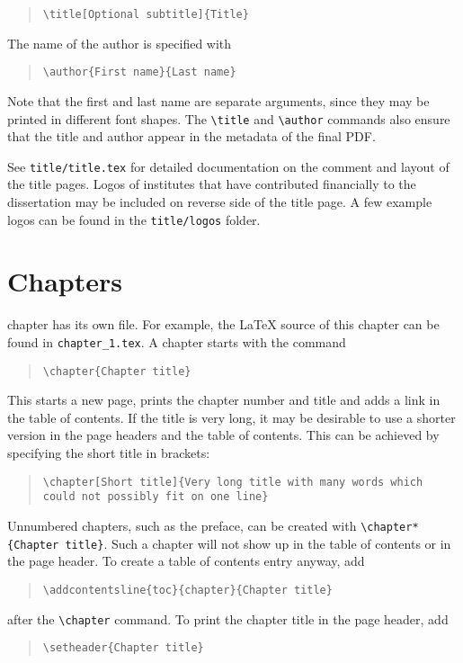 \begin{quote}
	\texttt{\textbackslash title[Optional subtitle]\{Title\}}
\end{quote}
The name of the author is specified with
\begin{quote}
	\texttt{\textbackslash author\{First name\}\{Last name\}}
\end{quote}
Note that the first and last name are separate arguments, since they may be printed in different font shapes. The \texttt{\textbackslash title} and \texttt{\textbackslash author} commands also ensure that the title and author appear in the metadata of the final PDF.

See \texttt{title/title.tex} for detailed documentation on the comment and layout of the title pages. Logos of institutes that have contributed financially to the dissertation may be included on reverse side of the title page. A few example logos can be found in the \texttt{title/logos} folder.

\section{Chapters}

 chapter has its own file. For example, the \LaTeX{} source of this chapter can be found in \texttt{chapter\_1.tex}. A chapter starts with the command

\begin{quote}
	\texttt{\textbackslash chapter\{Chapter title\}}
\end{quote}
This starts a new page, prints the chapter number and title and adds a link in the table of contents. If the title is very long, it may be desirable to use a shorter version in the page headers and the table of contents. This can be achieved by specifying the short title in brackets:

\begin{quote}
	\texttt{\textbackslash chapter[Short title]\{Very long title with many words which could not possibly fit on one line\}}
\end{quote}
Unnumbered chapters, such as the preface, can be created with \texttt{\textbackslash chapter*\{Chapter title\}}. Such a chapter will not show up in the table of contents or in the page header. To create a table of contents entry anyway, add
\begin{quote}
	\texttt{\textbackslash addcontentsline\{toc\}\{chapter\}\{Chapter title\}}
\end{quote}
after the \texttt{\textbackslash chapter} command. To print the chapter title in the page header, add
\begin{quote}
	\texttt{\textbackslash setheader\{Chapter title\}}
\end{quote}

